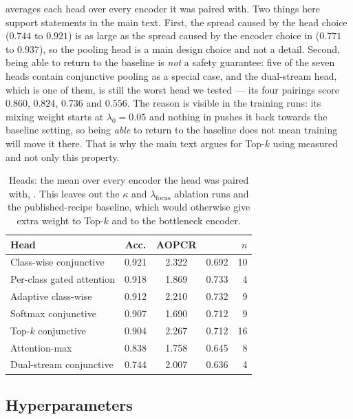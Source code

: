  averages each head over every encoder it was paired with. Two things here
support statements in the main text. First, the spread caused by the head choice ($0.744$ to $0.921$)
is as large as the spread caused by the encoder choice in  ($0.771$ to
$0.937$), so the pooling head is a main design choice and not a detail. Second, being able to return
to the baseline is \emph{not} a safety guarantee: five of the seven heads contain conjunctive pooling
as a special case, and the dual-stream head, which is one of them, is still the worst head we tested
--- its four pairings score $0.860$, $0.824$, $0.736$ and $0.556$. The reason is visible in the
training runs: its mixing weight starts at $\lambda_0 = 0.05$ and nothing in  pushes it
back towards the baseline setting, so being \emph{able} to return to the baseline does not mean
training will move it there. That is why the main text argues for \mbox{Top-$k$} using measured
\ndcg{} and not only this property.

\begin{table}[h]
\caption{Heads: the mean over every encoder the head was paired with, \webtraffic{}. This leaves out
the $\kappa$ and $\lambda_{\mathrm{focus}}$ ablation runs and the published-recipe baseline, which
would otherwise give extra weight to \mbox{Top-$k$} and to the bottleneck encoder.}
\label{tab:app_pooling}
\begin{center}
\small
\begin{tabular}{lcccr}
\toprule
\textbf{Head} & Acc. & AOPCR & \ndcg{} & $n$ \\
\midrule
Class-wise conjunctive    & 0.921 & 2.322 & 0.692 & 10 \\
Per-class gated attention & 0.918 & 1.869 & 0.733 & 4 \\
Adaptive class-wise       & 0.912 & 2.210 & 0.732 & 9 \\
Softmax conjunctive       & 0.907 & 1.690 & 0.712 & 9 \\
Top-$k$ conjunctive       & 0.904 & 2.267 & 0.712 & 16 \\
Attention-max             & 0.838 & 1.758 & 0.645 & 8 \\
Dual-stream conjunctive   & 0.744 & 2.007 & 0.636 & 4 \\
\bottomrule
\end{tabular}
\end{center}
\end{table}

\subsection{Hyperparameters}
\label{app:hparams}

